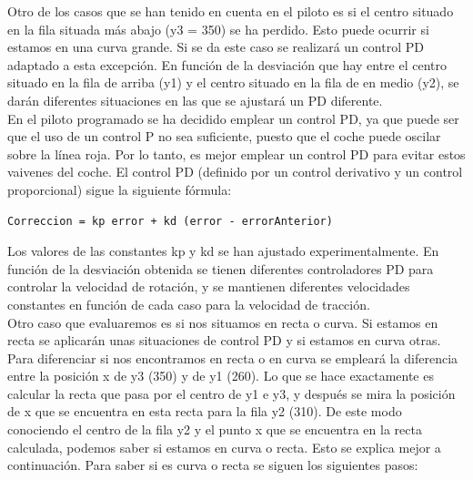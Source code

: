 Otro de los casos que se han tenido en cuenta en el piloto es si el centro situado en la fila situada más abajo (y3 = 350) se ha perdido. Esto puede ocurrir si estamos en una curva grande. Si se da este caso se realizará un control PD adaptado a esta excepción. En función de la desviación que hay entre el centro situado en la fila de arriba (y1) y el centro situado en la fila de en medio (y2), se darán diferentes situaciones en las que se ajustará un PD diferente.\\

En el piloto programado se ha decidido emplear un control PD, ya que puede ser que el uso de un control P no sea suficiente, puesto que el coche puede oscilar sobre la línea roja. Por lo tanto, es mejor emplear un control PD para evitar estos vaivenes del coche. El control PD (definido por un control derivativo y un control proporcional) sigue la siguiente fórmula:\\

\vspace{10pt}
\begin{lstlisting}
Correccion = kp error + kd (error - errorAnterior)
\end{lstlisting}
\vspace{20pt}

Los valores de las constantes kp y kd se han ajustado experimentalmente. En función de la desviación obtenida se tienen diferentes controladores PD para controlar la velocidad de rotación, y se mantienen diferentes velocidades constantes en función de cada caso para la velocidad de tracción.\\

Otro caso que evaluaremos es si nos situamos en recta o curva. Si estamos en recta se aplicarán unas situaciones de control PD y si estamos en curva otras. Para diferenciar si nos encontramos en recta o en curva se empleará la diferencia entre la posición x de y3 (350) y de y1 (260). Lo que se hace exactamente es calcular la recta que pasa por el centro de y1 e y3, y después se mira la posición de x que se encuentra en esta recta para la fila y2 (310). De este modo conociendo el centro de la fila y2 y el punto x que se encuentra en la recta calculada, podemos saber si estamos en curva o recta. Esto se explica mejor a continuación. Para saber si es curva o recta se siguen los siguientes pasos:\\

